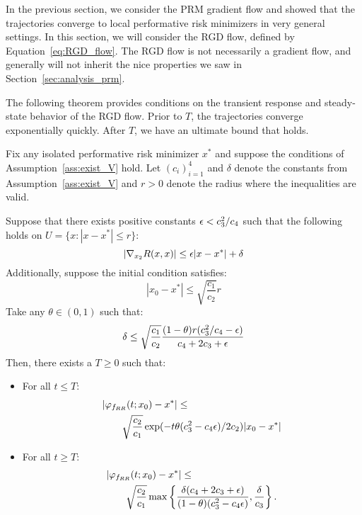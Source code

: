 
In the previous section, we consider the PRM gradient flow and showed that the trajectories converge to local performative risk minimizers in very general settings. In this section, we will consider the RGD flow, defined by Equation~\eqref{eq:RGD_flow}. 
The RGD flow is not necessarily a gradient flow, and generally will not inherit the nice properties we saw in Section~\ref{sec:analysis_prm}.

The following theorem provides conditions on the transient response and steady-state behavior of the RGD flow. Prior to $T$, the trajectories converge exponentially quickly. After $T$, we have an ultimate bound that holds.

\begin{theorem}
\label{th:perturb1}

Fix any isolated performative risk minimizer $x^*$ and suppose the conditions of Assumption~\ref{ass:exist_V} hold. Let $(c_i)_{i=1}^4$ and $\delta$ denote the constants from Assumption~\ref{ass:exist_V} and $r > 0$ denote the radius where the inequalities are valid.

Suppose that there exists positive constants $\epsilon < c_3^2/c_4$ such that the following holds on $U = \{ x : |x - x^*| \le r \}$:
\begin{equation}
\label{eq:ass_V1}
|\nabla_{x_2}R(x,x)| \le \epsilon |x-x^*| + \delta
\end{equation}
Additionally, suppose the initial condition satisfies:
\[
|x_0 - x^*| \le \sqrt{\frac{c_1}{c_2}}r
\]
Take any $\theta \in (0,1)$ such that:
\[
\delta \le \sqrt{\frac{c_1}{c_2}} 
\frac{(1 - \theta) r (c_3^2/c_4 - \epsilon)}{c_4 + 2c_3 + \epsilon}
\]
Then, there exists a $T \ge 0$ such that:
\begin{itemize}
\item For all $t \le T$:
\[
\begin{aligned}
&|\varphi_{f_{RR}}(t;x_0) - x^*| \le \\
&\qquad\sqrt{\frac{c_2}{c_1}} \exp(-t\theta (c_3^2 - c_4\epsilon)/2c_2) |x_0 - x^*|
\end{aligned}
\]
\item For all $t \ge T$:
\[
\begin{aligned}
    &|\varphi_{f_{RR}}(t;x_0) - x^*| 
    \le \\
    &\qquad\sqrt{\frac{c_2}{c_1}} 
    \max
    \left\{
    \frac{\delta (c_4 + 2c_3 + \epsilon)}{ (1-\theta) (c_3^2 - c_4 \epsilon)},
    \frac{\delta}{c_3}
    \right\}.
\end{aligned}
\]
\end{itemize}

\end{theorem}

